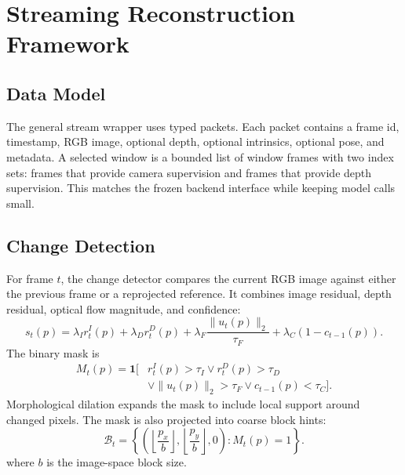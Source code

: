 \documentclass[conference]{IEEEtran}
\begin{document}
\section{Streaming Reconstruction Framework}
\subsection{Data Model}
The general stream wrapper uses typed packets. Each packet contains a frame id, timestamp, RGB image, optional depth, optional intrinsics, optional pose, and metadata. A selected window is a bounded list of window frames with two index sets: frames that provide camera supervision and frames that provide depth supervision. This matches the frozen backend interface while keeping model calls small.

\subsection{Change Detection}
For frame $t$, the change detector compares the current RGB image against either the previous frame or a reprojected reference. It combines image residual, depth residual, optical flow magnitude, and confidence:
\begin{equation}
s_t(p)=\lambda_I r^I_t(p)+\lambda_D r^D_t(p)+
\lambda_F \frac{\|u_t(p)\|_2}{\tau_F}+\lambda_C(1-c_{t-1}(p)).
\label{eq:score}
\end{equation}
The binary mask is
\begin{equation}
\begin{aligned}
M_t(p)=\mathbf{1}\big[
&r^I_t(p)>\tau_I \vee r^D_t(p)>\tau_D\\
&\vee \|u_t(p)\|_2>\tau_F
\vee c_{t-1}(p)<\tau_C
\big].
\end{aligned}
\end{equation}
Morphological dilation expands the mask to include local support around changed pixels. The mask is also projected into coarse block hints:
\begin{equation}
\mathcal{B}_t=\left\{\left(\left\lfloor\frac{p_x}{b}\right\rfloor,
\left\lfloor\frac{p_y}{b}\right\rfloor,0\right):M_t(p)=1\right\}.
\end{equation}
where $b$ is the image-space block size.
\end{document}
